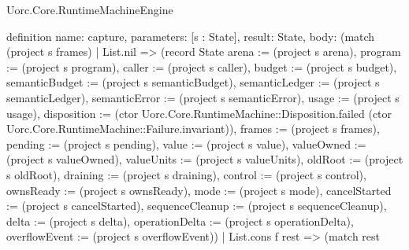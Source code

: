 \begin{lexlean}{Uorc.Core.RuntimeMachineEngine}
\begin{semanticmodule}
definition{
  name: capture,
  parameters: [s : State],
  result: State,
  body: (match (project s frames)
    | List.nil => (record State {arena := (project s arena), program := (project s program), caller := (project s caller), budget := (project s budget), semanticBudget := (project s semanticBudget), semanticLedger := (project s semanticLedger), semanticError := (project s semanticError), usage := (project s usage), disposition := (ctor Uorc.Core.RuntimeMachine::Disposition.failed (ctor Uorc.Core.RuntimeMachine::Failure.invariant)), frames := (project s frames), pending := (project s pending), value := (project s value), valueOwned := (project s valueOwned), valueUnits := (project s valueUnits), oldRoot := (project s oldRoot), draining := (project s draining), control := (project s control), ownsReady := (project s ownsReady), mode := (project s mode), cancelStarted := (project s cancelStarted), sequenceCleanup := (project s sequenceCleanup), delta := (project s delta), operationDelta := (project s operationDelta), overflowEvent := (project s overflowEvent)})
    | List.cons f rest => (match rest
}
\end{semanticmodule}
\end{lexlean}
